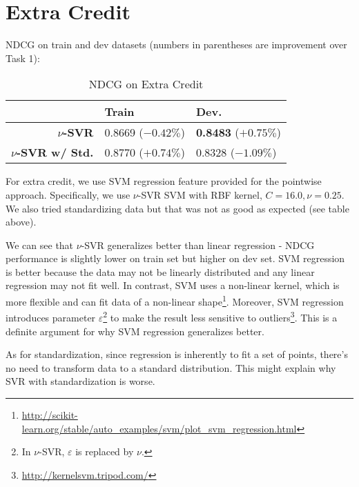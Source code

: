 \documentclass{article}
\begin{document}
\section{Extra Credit}

NDCG on train and dev datasets (numbers in parentheses are improvement over Task 1):

\begin{table}[!htb]
    \centering
    \begin{tabular}{| r | l | l |}
        \hline
        & \textbf{Train} & \textbf {Dev.} \\
        \hline
        \textbf{$\nu$-SVR} & 0.8669 ($-0.42\%$) & \textbf{0.8483} ($+0.75\%$) \\
        \hline
        \textbf{$\nu$-SVR w/ Std.} & 0.8770 ($+0.74\%$) & 0.8328 ($-1.09\%$) \\
        \hline
    \end{tabular}
    \caption{NDCG on Extra Credit}
\end{table}

For extra credit, we use SVM regression feature provided for the pointwise approach.
Specifically, we use $\nu$-SVR SVM with RBF kernel, $C=16.0,\nu=0.25$. We also tried standardizing data but that was not as good as expected (see table above).

We can see that $\nu$-SVR generalizes better than linear regression - NDCG performance is slightly lower on train set but higher on dev set. SVM regression is better because the data may not be linearly distributed and any linear regression may not fit well. In contrast, SVM uses a non-linear kernel, which is more flexible and can fit data of a non-linear shape\footnote{\url{http://scikit-learn.org/stable/auto_examples/svm/plot_svm_regression.html}}. Moreover, SVM regression introduces parameter $\varepsilon$\footnote{In $\nu$-SVR, $\varepsilon$ is replaced by $\nu$.} to make the result less sensitive to outliers\footnote{\url{http://kernelsvm.tripod.com/}}. This is a definite argument for why SVM regression generalizes better.

As for standardization, since regression is inherently to fit a set of points, there's no need to transform data to a standard distribution. This might explain why SVR with standardization is worse.
\end{document}
